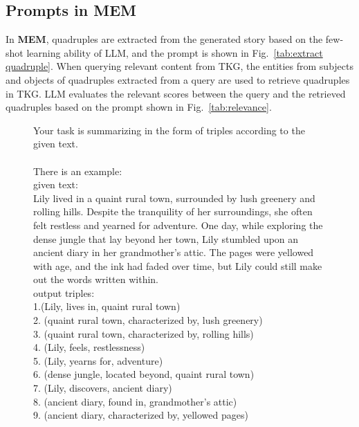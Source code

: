 \subsection{Prompts in MEM}
\label{sup:mem prompt}
In \textbf{MEM}, quadruples are extracted from the generated story based on the few-shot learning ability of LLM, and the prompt is shown in Fig.~\ref{tab:extract quadruple}. When querying relevant content from TKG, the entities from subjects and objects of quadruples extracted from a query are used to retrieve quadruples in TKG. LLM evaluates the relevant scores between the query and the retrieved quadruples based on the prompt shown in Fig.~\ref{tab:relevance}.


\begin{figure}[htbp]
\centering
\begin{tcolorbox}
       Your task is summarizing in the form of triples according to the given text.\\
\\
    There is an example:\\
    given text:\\
    Lily lived in a quaint rural town, surrounded by lush greenery and rolling hills. Despite the tranquility of her surroundings, she often felt restless and yearned for adventure. One day, while exploring the dense jungle that lay beyond her town, Lily stumbled upon an ancient diary in her grandmother's attic. The pages were yellowed with age, and the ink had faded over time, but Lily could still make out the words written within.\\
    output triples:\\
    1.(Lily, lives in, quaint rural town)\\
    2. (quaint rural town, characterized by, lush greenery)\\
    3. (quaint rural town, characterized by, rolling hills)\\
    4. (Lily, feels, restlessness)\\
    5. (Lily, yearns for, adventure)\\
    6. (dense jungle, located beyond, quaint rural town)\\
    7. (Lily, discovers, ancient diary)\\
    8. (ancient diary, found in, grandmother's attic)\\
    9. (ancient diary, characterized by, yellowed pages)\\

\end{tcolorbox}
\end{figure}

